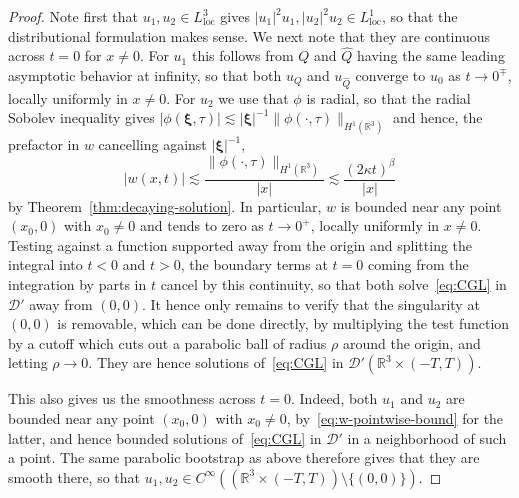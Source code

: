 \documentclass[10pt,a4paper]{amsart}
\begin{document}
\begin{proof}
  Note first that \(u_{1}, u_{2} \in L_{\text{loc}}^{3}\) gives
  \(|u_{1}|^{2}u_{1}, |u_{2}|^{2}u_{2} \in L_{\text{loc}}^{1}\), so
  that the distributional formulation makes sense. We next note that
  they are continuous across \(t = 0\) for \(x \neq 0\). For \(u_{1}\)
  this follows from \(Q\) and \(\hat{Q}\) having the same leading
  asymptotic behavior at infinity, so that both \(u_{Q}\) and
  \(u_{\hat{Q}}\) converge to \(u_{0}\) as \(t \to 0^{\mp}\), locally
  uniformly in \(x \neq 0\). For \(u_{2}\) we use that \(\phi\) is
  radial, so that the radial Sobolev inequality gives
  \(|\phi(\bm{\xi}, \tau)| \lesssim |\bm{\xi}|^{-1}\|\phi(\cdot,
  \tau)\|_{H^{1}(\mathbb{R}^{3})}\) and hence, the prefactor in \(w\)
  cancelling against \(|\bm{\xi}|^{-1}\),
  \begin{equation}\label{eq:w-pointwise-bound}
    |w(x, t)| \lesssim \frac{\|\phi(\cdot, \tau)\|_{H^{1}(\mathbb{R}^{3})}}{|x|}
    \lesssim \frac{(2\kappa t)^{\beta}}{|x|}
  \end{equation}
  by Theorem~\ref{thm:decaying-solution}. In particular, \(w\) is
  bounded near any point \((x_{0}, 0)\) with \(x_{0} \neq 0\) and
  tends to zero as \(t \to 0^{+}\), locally uniformly in
  \(x \neq 0\). Testing against a function supported away from the
  origin and splitting the integral into \(t < 0\) and \(t > 0\), the
  boundary terms at \(t = 0\) coming from the integration by parts in
  \(t\) cancel by this continuity, so that both solve~\eqref{eq:CGL}
  in \(\mathcal{D}'\) away from \((0, 0)\). It hence only remains to
  verify that the singularity at \((0, 0)\) is removable, which can be
  done directly, by multiplying the test function by a cutoff which
  cuts out a parabolic ball of radius \(\rho\) around the origin, and
  letting \(\rho \to 0\). They are hence solutions of~\eqref{eq:CGL}
  in \(\mathcal{D}'(\mathbb{R}^{3} \times (-T, T))\).

  This also gives us the smoothness across \(t = 0\). Indeed, both
  \(u_{1}\) and \(u_{2}\) are bounded near any point \((x_{0}, 0)\)
  with \(x_{0} \neq 0\), by~\eqref{eq:w-pointwise-bound} for the
  latter, and hence bounded solutions of~\eqref{eq:CGL} in
  \(\mathcal{D}'\) in a neighborhood of such a point. The same
  parabolic bootstrap as above therefore gives that they are smooth
  there, so that
  \(u_{1}, u_{2} \in C^{\infty}((\mathbb{R}^{3} \times (-T, T))
  \setminus \{(0, 0)\})\).


\end{proof}
\end{document}
